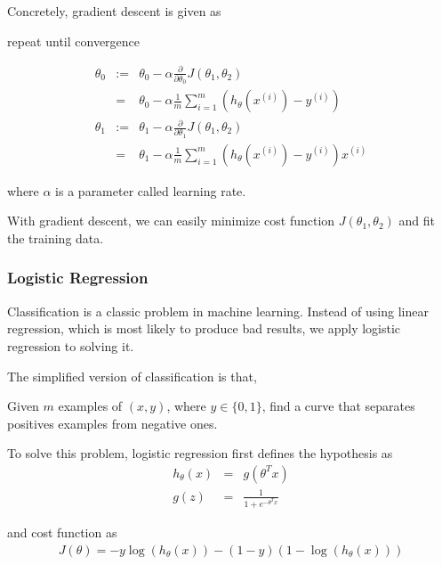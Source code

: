 \documentclass{article} %
\begin{document}
Concretely, gradient descent is given as

repeat until convergence

\begin{eqnarray*}
    \theta_0 &:=& \theta_0 - \alpha \frac{\partial}{\partial \theta_0}J(\theta_1, \theta_2) \\
        &=& \theta_0 - \alpha \frac{1}{m} \sum_{i=1}^m (h_\theta(x^{(i)})-y^{(i)})\\
    \theta_1 &:=& \theta_1 - \alpha \frac{\partial}{\partial \theta_1}J(\theta_1, \theta_2) \\
        &=& \theta_1 - \alpha \frac{1}{m} \sum_{i=1}^m (h_\theta(x^{(i)})-y^{(i)})x^{(i)}
\end{eqnarray*}

where $\alpha$ is a parameter called learning rate.

With gradient descent, we can easily minimize cost function $J(\theta_1,\theta_2)$ and fit the training data.

\subsubsection{Logistic Regression}
Classification is a classic problem in machine learning. Instead of using linear regression, which is most likely to produce bad results, we apply logistic regression to solving it.

The simplified version of classification is that,

Given $m$ examples of $(x,y)$, where $y \in \{0,1\}$, find a curve that separates positives examples from negative ones.

To solve this problem, logistic regression first defines the hypothesis as
\begin{eqnarray*}
    h_\theta(x)&=&g(\theta^T x)\\
    g(z)&=&\frac{1}{1+e^{-\theta^T x}}
\end{eqnarray*}

and cost function as
\begin{eqnarray}
    J(\theta)=-y \log(h_\theta(x)) - (1 - y)(1 - \log(h_\theta(x)))
    \label{eq:cost function}
\end{eqnarray}

\end{document}
